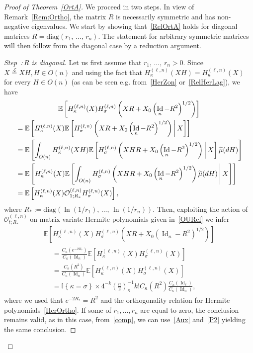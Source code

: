 \documentclass[10pt]{amsart}
\theoremstyle{definition}\newtheorem{defi}[theo]{Definition}\newtheorem{rema}[theo]{Remark}\newtheorem{exam}[theo]{Example}\newtheorem{exem}[theo]{Example}\newtheorem{nota}[theo]{Notation}
\DeclareMathOperator{\Id}{Id}
\newcommand{\diag}{\mathrm{diag}}
\newcommand{\clO}{\mathcal{O}}
\newcommand{\E}[1]{\mathbb{E}\left[#1\right]}
\newcommand{\eqLaw}{ \overset{\mathcal{L}}{=} }
\newcommand{\ind}[1]{\mathbb{I}
\left\{#1\right\}}
\newcounter{stepcount}
\newenvironment{step}[1]{\refstepcounter{stepcount}\begin{proof}[{Step~\thestepcount:\,}{#1}]}{\let\qed\relax\end{proof}}
\let\oldtilde\tilde
\renewcommand*{\tilde}[1]{\mathchoice{\widetilde{#1}}{\widetilde{#1}}{\oldtilde{#1}}{\oldtilde{#1}}}
\begin{document}
\begin{proof}[Proof of Theorem~\ref{OrtA}]
We proceed in two steps. In view of Remark~\ref{Rem:Ortho}, the matrix $R$ is necessarily symmetric and has non-negative eigenvalues. We start by showing that~\eqref{RelOrtA} holds for diagonal matrices $R=\diag(r_1,\,\ldots,\,r_n)$. The statement for arbitrary symmetric matrices will then follow from the diagonal case by a reduction argument.

\begin{step}{{$R$ is diagonal}}\label{Step1}
Let us first assume that $r_1,\,\ldots,\,r_n>0$. Since $X \eqLaw XH, H \in O(n)$ and using the fact that $H_{\kappa}^{(\ell,n)}(XH)=H_{\kappa}^{(\ell,n)}(X)$ for every $H \in O(n)$ (as can be seen e.g. from~\eqref{HerZon} or~\eqref{RelHerLag}), we have
\begin{multline}\label{comp}
\E{H_{\kappa}^{(\ell,n)}(X) H_{\sigma}^{(\ell,n)}\left(XR+X_0\left(\Id_n-R^2\right)^{1/2}\right)}\\
\begin{aligned}
&= \E{H_{\kappa}^{(\ell,n)}(X) \E{H_{\sigma}^{(\ell,n)}\left(XR+X_0\left(\Id_n-R^2\right)^{1/2}\right) \,\middle|\,X}}\\
&= \E{\int_{O(n)}H_{\kappa}^{(\ell,n)}(XH) \E{H_{\sigma}^{(\ell,n)}\left(XHR+X_0\left(\Id_n-R^2\right)^{1/2}\right) \,\middle|\,X}\tilde{\mu}(dH)}\\
&= \E{H_{\kappa}^{(\ell,n)}(X) \E{ \int_{O(n)}H_{\sigma}^{(\ell,n)}\left(XHR+X_0\left(\Id_n-R^2\right)^{1/2}\right) \tilde{\mu}(dH) \,\middle|\,X}}\\
&= \E{H_{\kappa}^{(\ell,n)}(X) \clO_{1;R_*}^{(\ell,n)}H_{\sigma}^{(\ell,n)}(X)},
\end{aligned}
\end{multline}
where $R_*:=\diag(\ln(1/r_1),\,\ldots,\,\ln(1/r_n))$. Then, exploiting the action of $\clO_{t;R_*}^{(\ell,n)}$ on matrix-variate Hermite polynomials given in~\eqref{OURel} we infer
\begin{multline*}
\E{H_{\kappa}^{(\ell,n)}(X) H_{\sigma}^{(\ell,n)}\left(XR+X_0\left(\Id_n-R^2\right)^{1/2}\right)}\\
\begin{aligned}
&= \frac{C_{\kappa}\left(e^{-2R_*}\right)}{C_{\kappa}(\Id_n)}\E{H_{\kappa}^{(\ell,n)}(X)H_{\sigma}^{(\ell,n)}(X)} \\
&= \frac{C_{\kappa}(R^2)}{C_{\kappa}(\Id_n)}\E{H_{\kappa}^{(\ell,n)}(X)H_{\sigma}^{(\ell,n)}(X)}\\
&=\ind{\kappa=\sigma}\times 4^{-k}\left(\frac{n}{2}\right)_{\kappa}^{-1} k ! C_{\kappa}(R^2)\frac{C_{\kappa}(\Id_{\ell})}{C_{\kappa}(\Id_n)},
\end{aligned}
\end{multline*}
where we used that $e^{-2R_*}=R^2$ and the orthogonality relation for Hermite polynomials~\eqref{HerOrtho}. If some of $r_1,\ldots,r_n$ are equal to zero, the conclusion remains valid, as in this case, from~\eqref{comp}, we can use~\eqref{Aux} and~\eqref{P2} yielding the same conclusion.
\end{step}


\end{proof}
\end{document}
